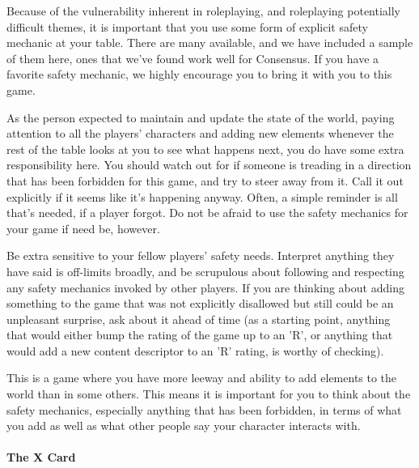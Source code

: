 \documentclass[
  oneside,
  statementpaper,
  9pt]{memoir}
\begin{document}
\begin{Narrator}

Because of the vulnerability inherent in roleplaying, and roleplaying potentially difficult themes, it is important that you use some form of explicit safety mechanic at your table. There are many available, and we have included a sample of them here, ones that we've found work well for Consensus. If you have a favorite safety mechanic, we highly encourage you to bring it with you to this game.

\end{Narrator}

\begin{MC}

As the person expected to maintain and update the state of the world, paying attention to all the players' characters and adding new elements whenever the rest of the table looks at you to see what happens next, you do have some extra responsibility here. You should watch out for if someone is treading in a direction that has been forbidden for this game, and try to steer away from it. Call it out explicitly if it seems like it's happening anyway. Often, a simple reminder is all that's needed, if a player forgot. Do not be afraid to use the safety mechanics for your game if need be, however.

Be extra sensitive to your fellow players' safety needs. Interpret anything they have said is off-limits broadly, and be scrupulous about following and respecting any safety mechanics invoked by other players. If you are thinking about adding something to the game that was not explicitly disallowed but still could be an unpleasant surprise, ask about it ahead of time (as a starting point, anything that would either bump the rating of the game up to an 'R', or anything that would add a new content descriptor to an 'R' rating, is worthy of checking).

\end{MC}

\begin{Player}

This is a game where you have more leeway and ability to add elements to the world than in some others. This means it is important for you to think about the safety mechanics, especially anything that has been forbidden, in terms of what you add as well as what other people say your character interacts with.

\end{Player}

\hypertarget{the-x-card}{%
\paragraph{The X Card}\label{the-x-card}}
\end{document}
